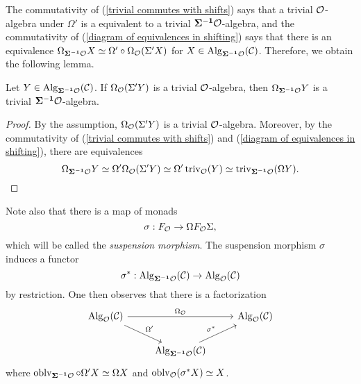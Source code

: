 The commutativity of (\ref{trivial commutes with shifts}) says that a trivial ${\mathcal{O}}$-algebra under $\Omega'$ is a equivalent to a trivial $\bf{\Sigma}^{-1} {\mathcal{O}}$-algebra, and the commutativity of (\ref{diagram of equivalences in shifting}) says that there is an equivalence $\Omega_{\bf{\Sigma}^{-1} {\mathcal{O}}}X \simeq \Omega'\circ \Omega_{{\mathcal{O}}}(\Sigma' X)$ for $X\in \operatorname{Alg}_{\bf{\Sigma}^{-1} {\mathcal{O}}}({\mathcal{C}})$.
Therefore, we obtain the following lemma.
\begin{lemma}
\label{transition of triviality}
Let $Y\in \operatorname{Alg}_{\bf{\Sigma}^{-1} {\mathcal{O}}}({\mathcal{C}})$.
If $\Omega_{{\mathcal{O}}}(\Sigma' Y)$ is a trivial ${\mathcal{O}}$-algebra, then
$\Omega_{\bf{\Sigma}^{-1} {\mathcal{O}}}Y$ is a trivial $\bf{\Sigma}^{-1} {\mathcal{O}}$-algebra.
\end{lemma}
\begin{proof}
    By the assumption, $\Omega_{{\mathcal{O}}}(\Sigma' Y)$ is a trivial ${\mathcal{O}}$-algebra.
    Moreover, by the commutativity of (\ref{trivial commutes with shifts}) and (\ref{diagram of equivalences in shifting}), there are equivalences 
    $$
    \Omega_{\bf{\Sigma}^{-1} {\mathcal{O}}}Y \simeq \Omega' \Omega_{{\mathcal{O}}}(\Sigma' Y)
    \simeq 
    \Omega'\operatorname{triv}_{{\mathcal{O}}}(Y)
    \simeq \operatorname{triv}_{\bf{\Sigma}^{-1} {\mathcal{O}}}(\Omega Y).
    $$
\end{proof}



Note also that there is a map of monads 
\begin{equation}
\label{suspension morphism}
    \sigma: F_{{\mathcal{O}}}\to \Omega F_{{\mathcal{O}}}\Sigma, 
\end{equation}
which will be called the \emph{suspension morphism}.  
The suspension morphism $\sigma$ induces a functor
$$
\sigma^*: \operatorname{Alg}_{\bf{\Sigma}^{-1} {\mathcal{O}} }({\mathcal{C}}) \to \operatorname{Alg}_{{\mathcal{O}} }({\mathcal{C}})
$$
by restriction. 
One then observes that there is a factorization 
\[
\begin{tikzcd}
     \Alg_{\CO}(\CC) &   & \Alg_{\CO}(\CC)\\
                     & \Alg_{\bf{\Sigma}^{-1} \CO }(\CC)  &
    \arrow[from = 1-1, to = 1-3, "\Omega_{\CO}"]
    \arrow[from = 1-1, to = 2-2, "\Omega'"]
    \arrow[from = 2-2, to = 1-3, "\sigma^*"]
\end{tikzcd}
\]
where $\operatorname{oblv}_{\bf{\Sigma}^{-1}{\mathcal{O}}}\circ \Omega' X \simeq \Omega X$ and $\operatorname{oblv}_{{\mathcal{O}}}( \sigma^* X)\simeq X$.



